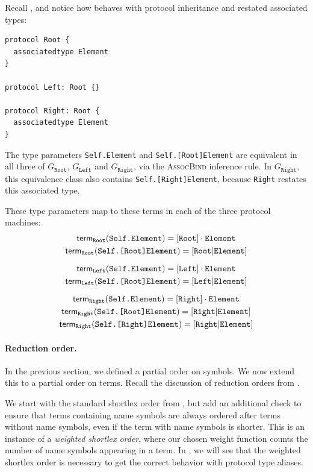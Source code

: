 \documentclass[../generics]{subfiles}
\begin{document}
\begin{example}\label{rqm assoc bind example}
Recall , and notice how  behaves with protocol inheritance and restated associated types:
\begin{Verbatim}
protocol Root {
  associatedtype Element
}

protocol Left: Root {}

protocol Right: Root {
  associatedtype Element
}
\end{Verbatim}
The type parameters \texttt{Self.Element} and \texttt{Self.[Root]Element} are equivalent in all three of $G_\texttt{Root}$, $G_\texttt{Left}$ and $G_\texttt{Right}$, via the \textsc{AssocBind} inference rule. In $G_\texttt{Right}$, this equivalence class also contains \texttt{Self.[Right]Element}, because \texttt{Right} restates this associated type.

These type parameters map to these terms in each of the three protocol machines:
\begin{gather*}
\mathsf{term}_{\texttt{Root}}(\texttt{Self.Element}) = [\texttt{Root}]\cdot\texttt{Element}\\
\mathsf{term}_{\texttt{Root}}(\texttt{Self.[Root]Element}) = [\texttt{Root}|\texttt{Element}]\\[\medskipamount]
\mathsf{term}_{\texttt{Left}}(\texttt{Self.Element}) = [\texttt{Left}]\cdot\texttt{Element}\\
\mathsf{term}_{\texttt{Left}}(\texttt{Self.[Root]Element}) = [\texttt{Left}|\texttt{Element}]\\[\medskipamount]
\mathsf{term}_{\texttt{Right}}(\texttt{Self.Element}) = [\texttt{Right}]\cdot\texttt{Element}\\
\mathsf{term}_{\texttt{Right}}(\texttt{Self.[Root]Element}) = [\texttt{Right}|\texttt{Element}]\\
\mathsf{term}_{\texttt{Right}}(\texttt{Self.[Right]Element}) = [\texttt{Right}|\texttt{Element}]
\end{gather*}
\end{example}

\paragraph{Reduction order.}
In the previous section, we defined a partial order on symbols. We now extend this to a partial order on terms. Recall the discussion of reduction orders from .

We start with the standard shortlex order from , but add an additional check to ensure that terms containing name symbols are always ordered after terms without name symbols, even if the term with name symbols is shorter. This is an instance of a \emph{weighted shortlex order}, where our chosen weight function counts the number of name symbols appearing in a term. In , we will see that the weighted shortlex order is necessary to get the correct behavior with protocol type aliases.
\end{document}
